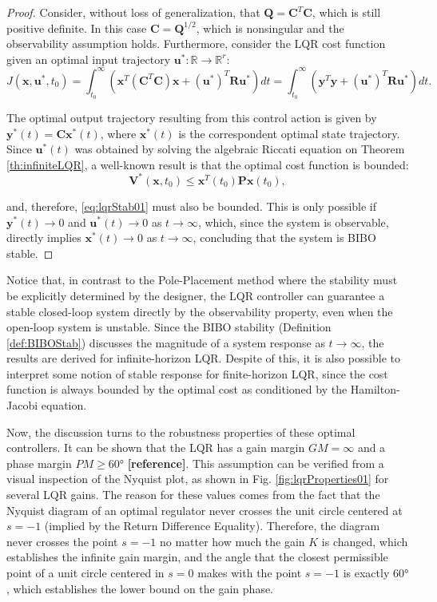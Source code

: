 \documentclass[a4paper,11pt]{book}
\numberwithin{figure}{chapter}
\numberwithin{equation}{chapter}
\numberwithin{table}{chapter}
\theoremstyle{definition}
\begin{document}
\begin{proof}
    Consider, without loss of generalization, that $\bm{Q} = \bm{C}^T \bm{C}$, which is still positive definite. In this case $\bm{C} = \bm{Q}^{1/2}$, which is nonsingular and the observability assumption holds. Furthermore, consider the LQR cost function given an optimal input trajectory $\bm{u}^* : \mathbb{R} \rightarrow \mathbb{R}^r$:
    \begin{equation} \label{eq:lqrStab01}
    J(\bm{x},\bm{u}^*,t_0) = \int_{t_0}^{\infty} \left( \bm{x}^T (\bm{C}^T \bm{C}) \bm{x} + (\bm{u}^*)^T \bm{R} \bm{u}^* \right) dt = \int_{t_0}^{\infty} \left( \bm{y}^T \bm{y} + (\bm{u}^*)^T \bm{R} \bm{u}^* \right) dt
.\end{equation}

The optimal output trajectory resulting from this control action is given by $\bm{y}^*(t) = \bm{C} \bm{x}^*(t)$, where $\bm{x}^*(t)$ is the correspondent optimal state trajectory. Since $\bm{u}^*(t)$ was obtained by solving the algebraic Riccati equation on Theorem \ref{th:infiniteLQR}, a well-known result is that the optimal cost function is bounded:
\begin{equation}
    \bm{V}^*(\bm{x}, t_0) \leq \bm{x}^T(t_0) \bm{P} \bm{x}(t_0)
,\end{equation}

\noindent and, therefore, \eqref{eq:lqrStab01} must also be bounded. This is only possible if $\bm{y}^*(t) \to 0$ and $\bm{u}^*(t) \to 0$ as $t \to \infty$, which, since the system is observable, directly implies $\bm{x}^*(t) \to 0$ as $t \to \infty$, concluding that the system is BIBO stable.
\end{proof}

Notice that, in contrast to the Pole-Placement method where the stability must be explicitly determined by the designer, the LQR controller can guarantee a stable closed-loop system directly by the observability property, even when the open-loop system is unstable. Since the BIBO stability (Definition \ref{def:BIBOStab}) discusses the magnitude of a system response as $t \to \infty$, the results are derived for infinite-horizon LQR. Despite of this, it is also possible to interpret some notion of stable response for finite-horizon LQR, since the cost function is always bounded by the optimal cost as conditioned by the Hamilton-Jacobi equation.

Now, the discussion turns to the robustness properties of these optimal controllers. It can be shown that the LQR has a gain margin $GM = \infty$ and a phase margin $PM \geq \ang{60}$ \textbf{[reference]}. This assumption can be verified from a visual inspection of the Nyquist plot, as shown in Fig. \ref{fig:lqrProperties01} for several LQR gains. The reason for these values comes from the fact that the Nyquist diagram of an optimal regulator never crosses the unit circle centered at $s = -1$ (implied by the Return Difference Equality). Therefore, the diagram never crosses the point $s = -1$ no matter how much the gain $K$ is changed, which establishes the infinite gain margin, and the angle that the closest permissible point of a unit circle centered in $s = 0$ makes with the point $s = -1$ is exactly $\ang{60}$, which establishes the lower bound on the gain phase.
\end{document}
